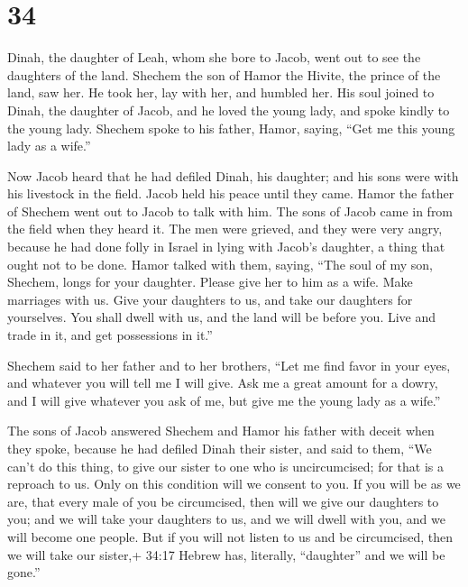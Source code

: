 \hypertarget{section-33}{%
\section{34}\label{section-33}}

 Dinah, the daughter of Leah, whom she bore to Jacob, went
out to see the daughters of the land.  Shechem the son of
Hamor the Hivite, the prince of the land, saw her. He took her, lay with
her, and humbled her.  His soul joined to Dinah, the
daughter of Jacob, and he loved the young lady, and spoke kindly to the
young lady.  Shechem spoke to his father, Hamor, saying,
``Get me this young lady as a wife.''

 Now Jacob heard that he had defiled Dinah, his daughter;
and his sons were with his livestock in the field. Jacob held his peace
until they came.  Hamor the father of Shechem went out to
Jacob to talk with him.  The sons of Jacob came in from the
field when they heard it. The men were grieved, and they were very
angry, because he had done folly in Israel in lying with Jacob's
daughter, a thing that ought not to be done.  Hamor talked
with them, saying, ``The soul of my son, Shechem, longs for your
daughter. Please give her to him as a wife.  Make marriages
with us. Give your daughters to us, and take our daughters for
yourselves.  You shall dwell with us, and the land will be
before you. Live and trade in it, and get possessions in it.''

 Shechem said to her father and to her brothers, ``Let me
find favor in your eyes, and whatever you will tell me I will give.
 Ask me a great amount for a dowry, and I will give
whatever you ask of me, but give me the young lady as a wife.''

 The sons of Jacob answered Shechem and Hamor his father
with deceit when they spoke, because he had defiled Dinah their sister,
 and said to them, ``We can't do this thing, to give our
sister to one who is uncircumcised; for that is a reproach to us.
 Only on this condition will we consent to you. If you will
be as we are, that every male of you be circumcised,  then
will we give our daughters to you; and we will take your daughters to
us, and we will dwell with you, and we will become one people.
 But if you will not listen to us and be circumcised, then
we will take our sister,+ 34:17 Hebrew has, literally, ``daughter'' and
we will be gone.''

